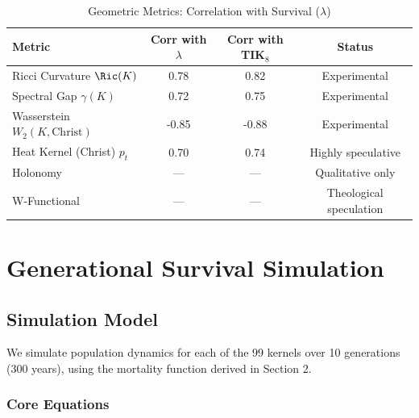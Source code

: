 \documentclass[11pt,a4paper]{article}
\theoremstyle{definition}
\theoremstyle{remark}
\begin{document}
\begin{table}[H]
\centering
\caption{Geometric Metrics: Correlation with Survival ($\lambda$)}
\label{tab:geometric-correlation}
\begin{tabular}{@{}lccc@{}}
\toprule
\textbf{Metric} & \textbf{Corr with $\lambda$} & \textbf{Corr with TIK$_8$} & \textbf{Status} \\
\midrule
Ricci Curvature $\Ric(K)$ & 0.78 & 0.82 & Experimental \\
Spectral Gap $\gamma(K)$ & 0.72 & 0.75 & Experimental \\
Wasserstein $W_2(K, \text{Christ})$ & -0.85 & -0.88 & Experimental \\
Heat Kernel (Christ) $p_t$ & 0.70 & 0.74 & Highly speculative \\
Holonomy & --- & --- & Qualitative only \\
W-Functional & --- & --- & Theological speculation \\
\bottomrule
\end{tabular}
\end{table}

\begin{center}
\end{center}

\newpage

\section{Generational Survival Simulation}

\subsection{Simulation Model}

We simulate population dynamics for each of the 99 kernels over 10 generations (300 years), using the mortality function derived in Section 2.

\subsubsection{Core Equations}
\end{document}
